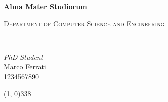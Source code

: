 \documentclass[../main.tex]{subfiles}
\begin{document}
    \begin{titlepage}
        \begin{center}
            \begin{Large}
                \textbf{Alma Mater Studiorum}\\
            \end{Large}

            \vspace{10pt}

            \begin{large}
                \textsc{Department of Computer Science and Engineering}\\
            \end{large}

            \vspace{10pt}

            \begin{LARGE}
                \begin{center}
                    \textbf{\theTitle}\\
                \end{center}
            \end{LARGE}

            \vspace{100pt}

            \begin{large}
                \begin{flushleft}
                    \textit{PhD Student}\\
                    \vspace{1pt}
                    Marco Ferrati\\
                    1234567890
                \end{flushleft}
            \end{large}

            \vfill

            \line(1, 0){338} \\

        \end{center}
    \end{titlepage}
\end{document}
